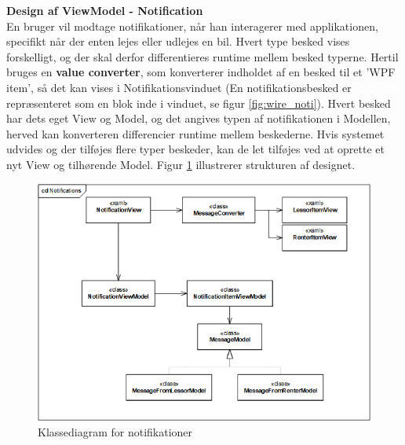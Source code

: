 \documentclass[Rapport/Rapport_main.tex]{subfiles}
\begin{document}
\textbf{Design af ViewModel - Notification}\\
En bruger vil modtage notifikationer, når han interagerer med applikationen, specifikt når der enten lejes eller udlejes en bil. Hvert type besked vises forskelligt, og der skal derfor differentieres runtime mellem besked typerne. Hertil bruges en \textbf{value converter}, som konverterer indholdet af en besked til et 'WPF item', så det kan vises i Notifikationsvinduet (En notifikationsbesked er repræsenteret som en blok inde i vinduet, se figur \ref{fig:wire_noti}). Hvert besked har dets eget View og Model, og det angives typen af notifikationen i Modellen, herved kan konverteren differencier runtime mellem beskederne. Hvis systemet udvides og der tilføjes flere typer beskeder, kan de let tilføjes ved at oprette et nyt View og tilhørende Model. Figur \ref{fig:cd_noti} illustrerer strukturen af designet. 
\begin{figure}[H]
    \centering
    \includegraphics[width=\textwidth]{SoftwareDesign/MVVMDesigns/Graphics/cd_notification.png}
    \caption{Klassediagram for notifikationer}
    \label{fig:cd_noti}
\end{figure}
\end{document}
